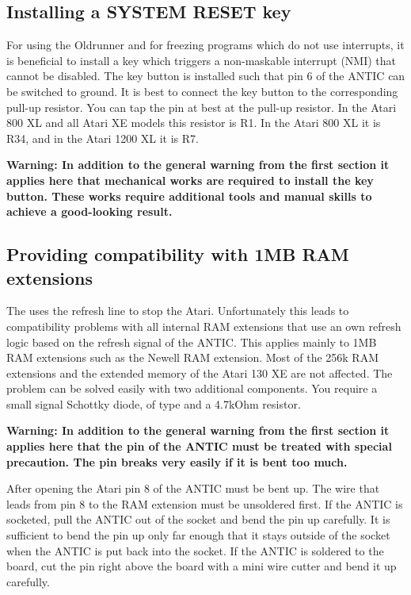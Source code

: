 \subsection{Installing a SYSTEM RESET key}
\label{sec:systemreset}

For using the Oldrunner and for freezing programs which do not use interrupts,
it is beneficial to install a  key which triggers a
non-maskable interrupt (NMI) that cannot be disabled. The key button is
installed such that pin 6 of the ANTIC can be switched to ground. It is best to
connect the key button to the corresponding pull-up resistor. You can tap the
pin at best at the pull-up resistor. In the Atari 800 XL and all Atari XE models
this resistor is R1. In the Atari 800 XL it is R34, and in the Atari 1200 XL it
is R7.

{\bfseries Warning: In addition to the general warning from the first section it
applies here that mechanical works are required to install the key button.
These works require additional tools and manual skills to achieve a good-looking
result.}

\subsection{Providing compatibility with 1MB RAM extensions}

The \frz uses the refresh line to stop the Atari. Unfortunately this leads to
compatibility problems with all internal RAM extensions that use an own refresh
logic based on the refresh signal of the ANTIC. This applies mainly to 1MB RAM
extensions such as the Newell RAM extension. Most of the 256k RAM
extensions and the extended memory of the Atari 130 XE are not affected.
The problem can be solved easily with two additional components. You require a
small signal Schottky diode, \eg of type  and a 4.7kOhm resistor.

{\bfseries Warning: In addition to the general warning from the first section it
applies here that the pin of the ANTIC must be treated with special
precaution. The pin breaks very easily if it is bent too much.}

After opening the Atari pin 8 of the ANTIC must be bent up. The wire that
leads from pin 8 to the RAM extension must be unsoldered first. If the ANTIC is
socketed, pull the ANTIC out of the socket and bend the pin up carefully. It is
sufficient to bend the pin up only far enough that it stays outside of the
socket when the ANTIC is put back into the socket. If the ANTIC is soldered to
the board, cut the pin right above the board with a mini wire cutter and bend it
up carefully.

